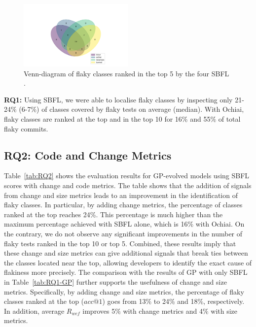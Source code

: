 \begin{figure}[ht]
\centering
\includegraphics[width=0.5\textwidth, trim=40mm 0mm 40mm 30mm, clip]{figures/sherloc/venn_sbfls.pdf}
\caption{Venn-diagram of flaky classes ranked in the top 5 by the four SBFL \formulas.} 
\label{fig:sbfl_venn}
\end{figure}

\begin{tcolorbox}[
    left=2pt,right=2pt,top=2pt,bottom=2pt,
    arc=0pt,
    boxrule=1.2pt
]
\textbf{RQ1:} 
Using SBFL, we were able to localise flaky classes by inspecting only 21-24\% (6-7\%) of classes covered by flaky tests on average (median). With Ochiai, flaky classes are ranked at the top and in the top 10 for 16\% and 55\% of total flaky commits. 
\end{tcolorbox}

\subsection{RQ2: Code and Change Metrics}

Table~\ref{tab:RQ2} shows the evaluation results for GP-evolved models using SBFL scores with change and code metrics.
The table shows that the addition of signals from change and size metrics leads to an improvement in the identification of flaky classes.
In particular, by adding change metrics, the percentage of classes ranked at the top reaches 24\%. 
This percentage is much higher than the maximum percentage achieved with SBFL alone, which is 16\% with Ochiai.
On the contrary, we do not observe any significant improvements in the number of flaky tests ranked in the top 10 or top 5. 
Combined, these results imply that these change and size metrics can give additional signals that break ties between the classes located near the top, allowing developers to identify the exact cause of flakiness more precisely.
The comparison with the results of GP with only SBFL \formulas in Table~\ref{tab:RQ1-GP} further supports the usefulness of change and size metrics.
Specifically, by adding change and size metrics, the percentage of flaky classes ranked at the top ($acc@1$) goes from 13\% to 24\% and 18\%, respectively. In addition, average $R_{wef}$ improves 5\% with change metrics and 4\% with size metrics. 

